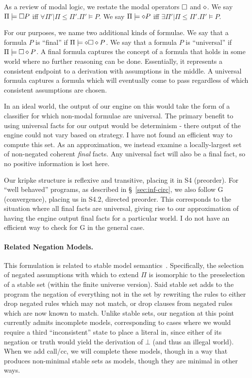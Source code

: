 As a review of modal logic, we restate the modal operators $\square$ and $\diamond$.
We say $\Pi \models \square P$ iff $\forall \Pi' | \Pi \leq \Pi'. \Pi' \models P$.
We say $\Pi \models \diamond P$ iff $\exists \Pi' | \Pi \leq \Pi'. \Pi' \models P$.

For our purposes, we name two additional kinds of formulae.
We say that a formula $P$ is ``final'' if $\Pi \models \diamond \square \diamond P$.
We say that a formula $P$ is ``universal'' if $\Pi \models \square \diamond P$.
A final formula captures the concept of a formula that holds in some world where no further reasoning can be done.
Essentially, it represents a consistent endpoint to a derivation with assumptions in the middle.
A universal formula captures a formula which will eventually come to pass regardless of which consistent assumptions are chosen.

In an ideal world, the output of our engine on this would take the form of a classifier for which non-modal formulae are universal.
The primary benefit to using universal facts for our output would be determinism - there output of the engine could not vary based on strategy.
I have not found an efficient way to compute this set.
As an approximation, we instead examine a locally-largest set of non-negated coherent \emph{final} facts.
Any universal fact will also be a final fact, so no positive information is lost here.

Our kripke structure is reflexive and transitive, placing it in S4 (preorder).
For ``well behaved'' programs, as described in \S~\ref{sec:inf-circ}, we also follow G (convergence), placing us in S4.2, directed preorder.
This corresponds to the situation where all final facts are universal, giving rise to our approximation of having the engine output final facts for a particular world.
I do not have an efficient way to check for G in the general case.

\paragraph{Related Negation Models.}
This formulation is related to stable model semantics~\cite{stable-model}.
Specifically, the selection of negated assumptions with which to extend $\Pi$ is isomorphic to the preselection of a stable set (within the finite universe version).
Said stable set adds to the program the negation of everything not in the set by rewriting the rules to either drop negated rules which may not match, or drop clauses from negated rules which are now known to match.
Unlike stable sets, our negation at this point currently admits incomplete models, corresponding to cases where we would require a third ``inconsistent'' state to place a literal in, since either of its negation or truth would yield the derivation of $\bot$ (and thus an illegal world).
When we add call/cc, we will complete these models, though in a way that produces non-minimal stable sets as models, though they are minimal in other ways.

